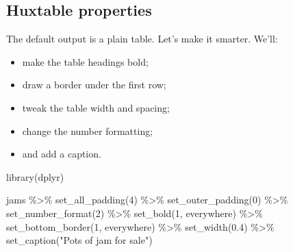 \documentclass[
]{article}
\newenvironment{Shaded}{\begin{snugshade}}{\end{snugshade}}
\newcommand{\DecValTok}[1]{\textcolor[rgb]{0.00,0.00,0.81}{#1}}
\newcommand{\FloatTok}[1]{\textcolor[rgb]{0.00,0.00,0.81}{#1}}
\newcommand{\FunctionTok}[1]{\textcolor[rgb]{0.00,0.00,0.00}{#1}}
\newcommand{\NormalTok}[1]{#1}
\newcommand{\SpecialCharTok}[1]{\textcolor[rgb]{0.00,0.00,0.00}{#1}}
\newcommand{\StringTok}[1]{\textcolor[rgb]{0.31,0.60,0.02}{#1}}
\providecommand{\tightlist}{%
  \setlength{\itemsep}{0pt}\setlength{\parskip}{0pt}}
\begin{document}
\FloatBarrier

\hypertarget{huxtable-properties}{%
\subsection{Huxtable properties}\label{huxtable-properties}}

The default output is a plain table. Let's make it smarter. We'll:

\begin{itemize}
\tightlist
\item
  make the table headings bold;
\item
  draw a border under the first row;
\item
  tweak the table width and spacing;
\item
  change the number formatting;
\item
  and add a caption.
\end{itemize}

\begin{Shaded}
\begin{Highlighting}[]
\FunctionTok{library}\NormalTok{(dplyr) }

\NormalTok{jams }\SpecialCharTok{\%\textgreater{}\%} 
      \FunctionTok{set\_all\_padding}\NormalTok{(}\DecValTok{4}\NormalTok{) }\SpecialCharTok{\%\textgreater{}\%} 
      \FunctionTok{set\_outer\_padding}\NormalTok{(}\DecValTok{0}\NormalTok{) }\SpecialCharTok{\%\textgreater{}\%} 
      \FunctionTok{set\_number\_format}\NormalTok{(}\DecValTok{2}\NormalTok{) }\SpecialCharTok{\%\textgreater{}\%} 
      \FunctionTok{set\_bold}\NormalTok{(}\DecValTok{1}\NormalTok{, everywhere) }\SpecialCharTok{\%\textgreater{}\%} 
      \FunctionTok{set\_bottom\_border}\NormalTok{(}\DecValTok{1}\NormalTok{, everywhere) }\SpecialCharTok{\%\textgreater{}\%} 
      \FunctionTok{set\_width}\NormalTok{(}\FloatTok{0.4}\NormalTok{) }\SpecialCharTok{\%\textgreater{}\%} 
      \FunctionTok{set\_caption}\NormalTok{(}\StringTok{"Pots of jam for sale"}\NormalTok{)}
\end{Highlighting}
\end{Shaded}

 
  \providecommand{\huxb}[2]{\arrayrulecolor[RGB]{#1}\global\arrayrulewidth=#2pt}
  \providecommand{\huxvb}[2]{\color[RGB]{#1}\vrule width #2pt}
  \providecommand{\huxtpad}[1]{\rule{0pt}{#1}}
  \providecommand{\huxbpad}[1]{\rule[-#1]{0pt}{#1}}
\end{document}
